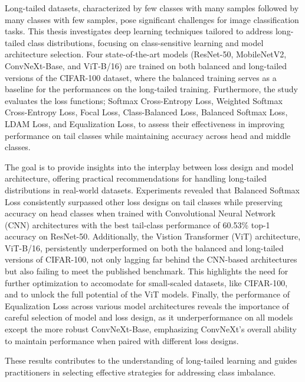 Long-tailed datasets, characterized by few classes with many samples followed by many classes with few samples, pose significant challenges for image classification tasks. This thesis investigates deep learning techniques tailored to address long-tailed class distributions, focusing on class-sensitive learning and model architecture selection. Four state-of-the-art models (ResNet-50, MobileNetV2, ConvNeXt-Base, and ViT-B/16) are trained on both balanced and long-tailed versions of the CIFAR-100 dataset, where the balanced training serves as a baseline for the performances on the long-tailed training. Furthermore, the study evaluates the loss functions; Softmax Cross-Entropy Loss, Weighted Softmax Cross-Entropy Loss, Focal Loss, Class-Balanced Loss, Balanced Softmax Loss, LDAM Loss, and Equalization Loss, to assess their effectiveness in improving performance on tail classes while maintaining accuracy across head and middle classes. 

The goal is to provide insights into the interplay between loss design and model architecture, offering practical recommendations for handling long-tailed distributions in real-world datasets. Experiments revealed that Balanced Softmax Loss consistently surpassed other loss designs on tail classes while preserving accuracy on head classes when trained with Convolutional Neural Network (CNN) architectures with the best tail-class performance of 60.53\% top-1 accuracy on ResNet-50. Additionally, the Vistion Transformer (ViT) architecture, ViT-B/16, persistently underperformed on both the balanced and long-tailed versions of CIFAR-100, not only lagging far behind the CNN-based architectures but also failing to meet the published benchmark. This highlights the need for further optimization to accomodate for small-scaled datasets, like CIFAR-100, and to unlock the full potential of the ViT models. Finally, the performance of Equalization Loss across various model architectures reveals the importance of careful selection of model and loss design, as it underperformance on all models except the more robust ConvNeXt-Base, emphasizing ConvNeXt's overall ability to maintain performance when paired with different loss designs.

These results contributes to the understanding of long-tailed learning and guides practitioners in selecting effective strategies for addressing class imbalance.

